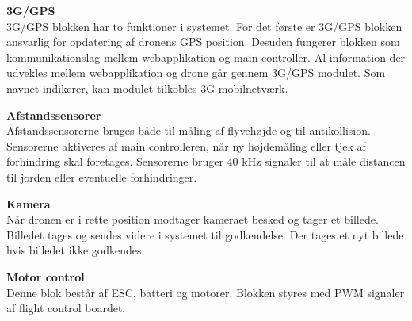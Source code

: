 \textbf{3G/GPS}\\
3G/GPS blokken har to funktioner i systemet. For det første er 3G/GPS blokken ansvarlig for opdatering af dronens GPS position. Desuden fungerer blokken som kommunikationslag mellem webapplikation og main controller. Al information der udvekles mellem webapplikation og drone går gennem 3G/GPS modulet. Som navnet indikerer, kan modulet tilkobles 3G mobilnetværk.  

\textbf{Afstandssensorer}\\
Afstandssensorerne bruges både til måling af flyvehøjde og til antikollision. Sensorerne aktiveres af main controlleren, når ny højdemåling eller tjek af forhindring skal foretages. Sensorerne bruger 40 kHz signaler til at måle distancen til jorden eller eventuelle forhindringer.

\textbf{Kamera}\\
Når dronen er i rette position modtager kameraet besked og tager et billede. Billedet tages og sendes videre i systemet til godkendelse. Der tages et nyt billede hvis billedet ikke godkendes.

\textbf{Motor control}\\
Denne blok består af ESC, batteri og motorer. Blokken styres med PWM signaler af flight control boardet.
